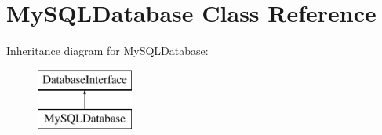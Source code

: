 \hypertarget{class_my_s_q_l_database}{}\section{My\+S\+Q\+L\+Database Class Reference}
\label{class_my_s_q_l_database}
Inheritance diagram for My\+S\+Q\+L\+Database\+:\begin{figure}[H]
\begin{center}
\leavevmode
\includegraphics[height=2.000000cm]{class_my_s_q_l_database}
\end{center}
\end{figure}

